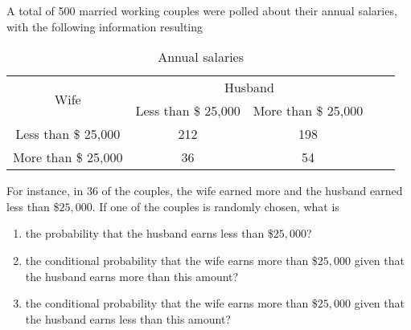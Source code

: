 \documentclass{article}[12pt]
\newenvironment{problem}[1]
  {\renewcommand\theinnercustomprblm{#1}\innercustomprblm}
  {\endinnercustomprblm}
\begin{document}
\begin{problem}{3.21}\normalfont
A total of 500 married working couples were polled about their annual salaries, with the following information resulting
\begin{table}[ph]
  \centering
  \begin{tabular}{c|c|c|c|c}
    \hline
    \multirow{2}{*}{Wife} & \multicolumn{2}{c}{Husband} \\
    \hhline{~--}
    & Less than \$ 25,000 & More than \$ 25,000 \\
    \hline
    Less than \$ 25,000 & 212 & 198 \\
    \hline
    More than \$ 25,000 & 36 & 54 \\
    \hline
  \end{tabular}
  \caption{Annual salaries}
  \label{T:peak}
\end{table}
For instance, in $36$ of the couples, the wife earned more and the husband earned less than \$$25,000$. 
If one of the couples is randomly chosen, what is
\begin{enumerate}[label=(\alph*)]
    \item the probability that the husband earns less than \$$25,000$?
    \item the conditional probability that the wife earns more than \$$25,000$ given that the husband earns more than this amount?
    \item the conditional probability that the wife earns more than \$$25,000$ given that the husband earns less than this amount?
\end{enumerate}
\end{problem}
\end{document}
